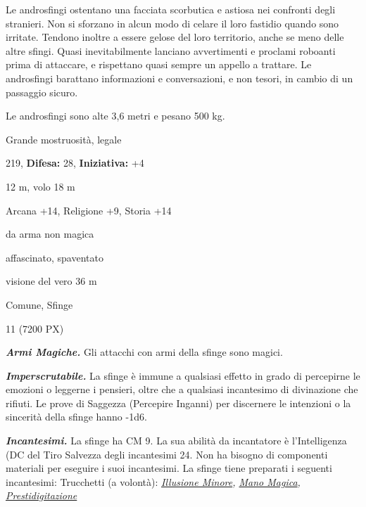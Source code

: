 \begin{multicols}{2}
{Le androsfingi ostentano una facciata scorbutica e astiosa nei confronti degli stranieri. Non si sforzano in alcun modo di celare il loro fastidio quando sono irritate. Tendono inoltre a essere gelose del loro territorio, anche se meno delle altre sfingi. Quasi inevitabilmente lanciano avvertimenti e proclami roboanti prima di attaccare, e rispettano quasi sempre un appello a trattare. Le androsfingi barattano informazioni e conversazioni, e non tesori, in cambio di un passaggio sicuro.

Le androsfingi sono alte 3,6 metri e pesano 500 kg.

\noindent
\begin{description}[noitemsep, topsep=0pt, parsep=0pt, partopsep=0pt, leftmargin=0cm, labelwidth=2.2cm]
	\item[\textbf{Taglia/Tipo:}] Grande mostruosità, legale
	\item[\textbf{Caratt.:}] 
	\item[\textbf{Punti Ferita:}] 219,  \textbf{Difesa:} 28,  \textbf{Iniziativa:} +4
	\item[\textbf{Movimento:}] 12 m, volo 18 m
	\item[\textbf{Tiri Salvez.:}] 
	\item[\textbf{Comp.:}] Arcana +14, Religione +9, Storia +14
	\item[\textbf{Res. Danni:}] da arma non magica
	\item[\textbf{Immunità:}] affascinato, spaventato
	\item[\textbf{Sensi:}] visione del vero 36 m
	\item[\textbf{Linguaggi:}] Comune, Sfinge
	\item[\textbf{Sfida:}] 11 (7200 PX)\smallskip
\end{description}

\emph{\textbf{Armi Magiche.}} Gli attacchi con armi della sfinge sono magici.

\emph{\textbf{Imperscrutabile.}} La sfinge è immune a qualsiasi effetto in grado di percepirne le emozioni o leggerne i pensieri, oltre che a qualsiasi incantesimo di divinazione che rifiuti. Le prove di Saggezza (Percepire Inganni) per discernere le intenzioni o la sincerità della sfinge hanno -1d6.

\emph{\textbf{Incantesimi.}} La sfinge ha CM 9. La sua abilità da incantatore è l'Intelligenza (DC del Tiro Salvezza degli incantesimi 24. Non ha bisogno di componenti materiali per eseguire i suoi incantesimi. La sfinge tiene preparati i seguenti incantesimi: Trucchetti (a volontà): \emph{\hyperlink{Illusione Minore}{Illusione Minore}, \hyperlink{Mano Magica}{Mano Magica},} \emph{\hyperlink{Prestidigitazione}{Prestidigitazione}}

}
\end{multicols}
